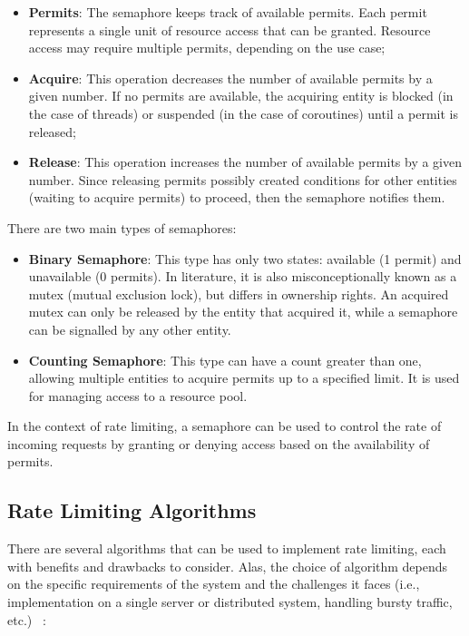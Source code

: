\begin{itemize}
    \item \textbf{Permits}: The semaphore keeps track of available permits.
    Each permit represents a single unit of resource access that can be granted.
    Resource access may require multiple permits, depending on the use case;
    \item \textbf{Acquire}: This operation decreases the number of available permits by a given number.
    If no permits are available, the acquiring entity is blocked (in the case of threads) or suspended (in the case of coroutines) until a permit is released;
    \item \textbf{Release}: This operation increases the number of available permits by a given number.
    Since releasing permits possibly created conditions for other entities (waiting to acquire permits) to proceed, then the semaphore notifies them.
\end{itemize}

There are two main types of semaphores:
\begin{itemize}
    \item \textbf{Binary Semaphore}:
    This type has only two states: available (1 permit) and unavailable (0 permits).
    In literature, it is also misconceptionally known as a mutex (mutual exclusion lock),
    but differs in ownership rights.
    An acquired mutex can only be released by the entity that acquired it, while a semaphore can be signalled by any other entity.
    \item \textbf{Counting Semaphore}: This type can have a count greater than one, allowing multiple entities to acquire permits up to a specified limit.
    It is used for managing access to a resource pool.
\end{itemize}

In the context of rate limiting, a semaphore can be used to control the rate of incoming requests by granting or denying access based on the availability of permits.

\subsection{Rate Limiting Algorithms}\label{subsec:rate-limiter-algorithms}

There are several algorithms that can be used to implement rate limiting, each with benefits and drawbacks to consider.
Alas,
the choice of algorithm depends on the specific requirements of the system and the challenges it faces
(i.e., implementation on a single server or distributed system, handling bursty traffic, etc.)
~\cite{medium-rate-limiting-algorithms,nordic-apis-rate-limiting-algorithms}:

